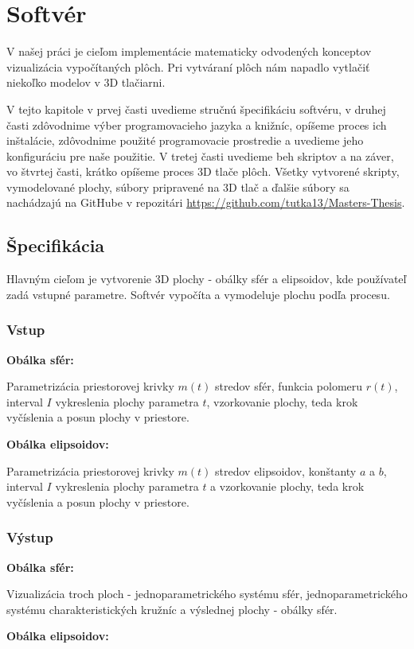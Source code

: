 \chapter{Softvér}
V našej práci je cieľom implementácie matematicky odvodených konceptov vizualizácia vypočítaných plôch. Pri vytváraní plôch nám napadlo vytlačiť niekoľko modelov v 3D tlačiarni. 

V tejto kapitole v prvej časti uvedieme stručnú špecifikáciu softvéru, v druhej časti zdôvodnime výber programovacieho jazyka a knižníc, opíšeme proces ich inštalácie, zdôvodnime použité programovacie prostredie a uvedieme jeho konfiguráciu pre naše použitie. V tretej časti uvedieme beh skriptov a na záver, vo štvrtej časti, krátko opíšeme proces 3D tlače plôch. Všetky vytvorené skripty, vymodelované plochy, súbory pripravené na 3D tlač a ďalšie súbory sa nachádzajú na GitHube v repozitári \url{https://github.com/tutka13/Masters-Thesis}.
 
\section{Špecifikácia}
Hlavným cieľom je vytvorenie 3D plochy - obálky sfér a elipsoidov, kde používateľ zadá vstupné parametre. Softvér vypočíta a vymodeluje plochu podľa procesu.

\subsection{Vstup}
\textbf{Obálka sfér:}

Parametrizácia priestorovej krivky $m(t)$ stredov sfér, funkcia polomeru $r(t)$, interval $I$ vykreslenia plochy parametra $t$, vzorkovanie plochy, teda krok vyčíslenia a posun plochy v priestore.

\noindent \textbf{Obálka elipsoidov:}

Parametrizácia priestorovej krivky $m(t)$ stredov elipsoidov, konštanty $a$ a $b$, interval $I$ vykreslenia plochy parametra $t$ a vzorkovanie plochy, teda krok vyčíslenia a posun plochy v priestore.
\subsection{Výstup} 
\textbf{Obálka sfér:}

Vizualizácia troch ploch - jednoparametrického systému sfér, jednoparametrického systému charakteristických kružníc a výslednej plochy - obálky sfér.

\noindent \textbf{Obálka elipsoidov:}

